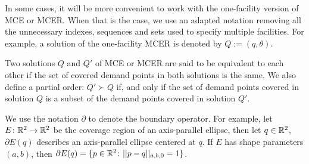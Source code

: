 In some cases, it will be more convenient to work with the one-facility version of MCE or MCER. When that is the case, we use an adapted notation removing all the unnecessary indexes, sequences and sets used to specify multiple facilities. For example, a solution of the one-facility MCER is denoted by $Q:=(q,\theta)$.

Two solutions $Q$ and $Q'$ of MCE or MCER are said to be equivalent to each other if
the set of covered demand points in both solutions is the same.
We also define a partial order: $Q' \succ Q$ if, and only if the set of demand points covered in solution $Q$ is a subset of the demand points covered in solution $Q'$.

We use the notation $\partial$ to denote the boundary operator. For example, let $E \colon \mathbb{R}^2\to\mathbb{R}^2$ be the coverage region of an axis-parallel ellipse, then let $q\in\mathbb{R}^2$, $\partial E(q)$ describes an axis-parallel ellipse centered at $q$. If $E$ has shape parameters $(a, b)$, then $\partial E(q) = \{p \in \mathbb{R}^2\colon ||p-q||_{a,b,0} = 1\}$.

